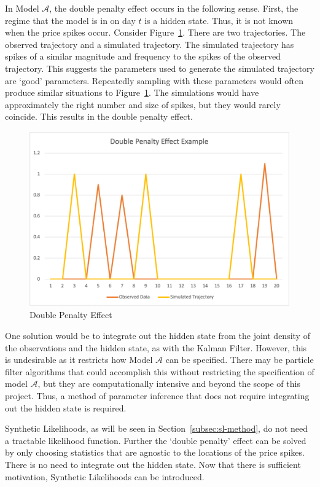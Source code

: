 In Model $\mathcal{A}$, the double penalty effect occurs in the following sense. First, the regime that the model is in on day $t$ is a hidden state. Thus, it is not known when the price spikes occur. Consider Figure~\ref{fig:double_penalty}. There are two trajectories. The observed trajectory and a simulated trajectory. The simulated trajectory has spikes of a similar magnitude and frequency to the spikes of the observed trajectory. This suggests the parameters used to generate the simulated trajectory are `good' parameters. Repeatedly sampling with these parameters would often produce similar situations to Figure~\ref{fig:double_penalty}. The simulations would have approximately the right number and size of spikes, but they would rarely coincide. This results in the double penalty effect.

\begin{figure}[H]
    \centering
    \includegraphics[width=12cm]{images/sl/double_penalty_excel.png}
    \caption{Double Penalty Effect \citep{haben_2014}}
    \label{fig:double_penalty}
\end{figure}

One solution would be to integrate out the hidden state from the joint density of the observations and the hidden state, as with the Kalman Filter. However, this is undesirable as it restricts how Model $\mathcal{A}$ can be specified. There may be particle filter algorithms that could accomplish this without restricting the specification of model $\mathcal{A}$, but they are computationally intensive and beyond the scope of this project. Thus, a method of parameter inference that does not require integrating out the hidden state is required.

Synthetic Likelihoods, as will be seen in Section~\ref{subsec:sl-method}, do not need a tractable likelihood function. Further the `double penalty' effect can be solved by only choosing statistics that are agnostic to the locations of the price spikes. There is no need to integrate out the hidden state. Now that there is sufficient motivation, Synthetic Likelihoods can be introduced.


